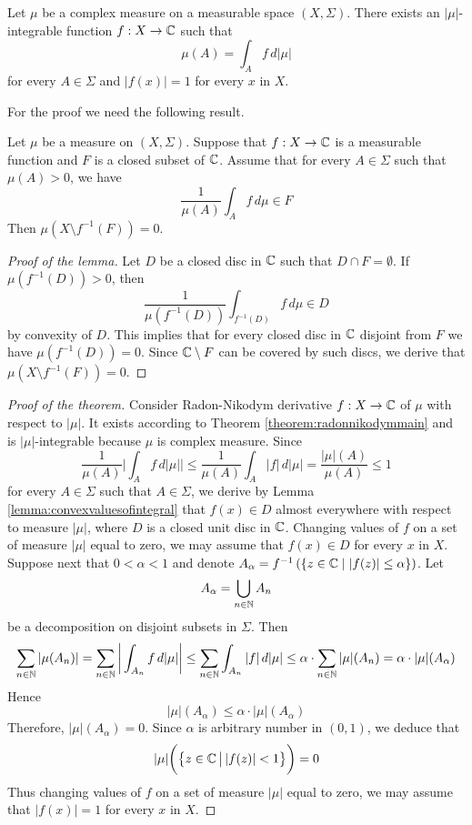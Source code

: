 \begin{theorem}\label{theorem:structureofcomplexmeasures}
Let $\mu$ be a complex measure on a measurable space $(X,\Sigma)$. There exists an $|\mu|$-integrable function $f:X\rightarrow {\mathbb C}$ such that
$$\mu(A) = \int_Af\,d|\mu|$$
for every $A\in \Sigma$ and $|f(x)|=1$ for every $x$ in $X$.
\end{theorem}
\noindent
For the proof we need the following result.
\begin{lemma}\label{lemma:convexvaluesofintegral}
Let $\mu$ be a measure on $(X,\Sigma)$. Suppose that $f:X\rightarrow {\mathbb C}$ is a measurable function and $F$ is a closed subset of ${\mathbb C}$. Assume that for every $A\in \Sigma$ such that $\mu(A)>0$, we have
$$\frac{1}{\mu(A)}\int_A f\,d\mu \in F$$
Then $\mu\left(X\setminus f^{-1}(F)\right)=0$.
\end{lemma}
\begin{proof}[Proof of the lemma]
Let $D$ be a closed disc in ${\mathbb C}$ such that $D\cap F = \emptyset$. If $\mu\left(f^{-1}(D)\right) > 0$, then
$$\frac{1}{\mu\left(f^{-1}(D)\right)}\int_{f^{-1}(D)}f\,d\mu \in D$$
by convexity of $D$. This implies that for every closed disc in ${\mathbb C}$ disjoint from $F$ we have $\mu\left(f^{-1}(D)\right) = 0$. Since ${\mathbb C}\setminus F$ can be covered by such discs, we derive that $\mu\left(X\setminus f^{-1}(F)\right)=0$.
\end{proof}

\begin{proof}[Proof of the theorem]
Consider Radon-Nikodym derivative $f:X\rightarrow {\mathbb C}$ of $\mu$ with respect to $|\mu|$. It exists according to Theorem \ref{theorem:radonnikodymmain} and is $|\mu|$-integrable because $\mu$ is complex measure. Since
$$\frac{1}{\mu(A)}\bigg|\int_Af\,d|\mu|\bigg| \leq \frac{1}{\mu(A)}\int_A|f|\,d|\mu| = \frac{|\mu|(A)}{\mu(A)}\leq 1$$
for every $A\in \Sigma$ such that $A\in \Sigma$, we derive by Lemma \ref{lemma:convexvaluesofintegral} that $f(x)\in D$ almost everywhere with respect to measure $|\mu|$, where $D$ is a closed unit disc in ${\mathbb C}$. Changing values of $f$ on a set of measure $|\mu|$ equal to zero, we may assume that $f(x)\in D$ for every $x$ in $X$.\\
Suppose next that  $0<\alpha < 1$ and denote $A_{\alpha} = f^{-1}\left(\{z\in {\mathbb C}\mid|f(z)|\leq \alpha \}\right)$. Let
$$A_{\alpha} = \bigcup_{n\in {\mathbb N}}A_n$$
be a decomposition on disjoint subsets in $\Sigma$. Then
$$\sum_{n\in {\mathbb N}}|\mu(A_n)| = \sum_{n\in {\mathbb N}}\bigg|\int_{A_n}f\,d|\mu|\bigg|\leq  \sum_{n\in {\mathbb N}}\int_{A_n}|f|\,d|\mu| \leq \alpha \cdot \sum_{n\in {\mathbb N}} |\mu|(A_n) = \alpha\cdot |\mu|(A_{\alpha})$$
Hence
$$|\mu|(A_{\alpha}) \leq \alpha\cdot |\mu|(A_{\alpha})$$
Therefore, $|\mu|(A_{\alpha})=0$. Since $\alpha$ is arbitrary number in $(0,1)$, we deduce that
$$|\mu|\bigg(\big\{z\in {\mathbb C}\,\big|\,|f(z)| < 1\big\}\bigg) = 0$$
Thus changing values of $f$ on a set of measure $|\mu|$ equal to zero, we may assume that $|f(x)|=1$ for every $x$ in $X$.
\end{proof}

